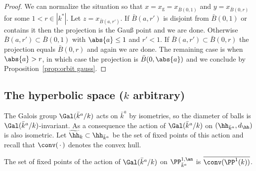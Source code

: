 \begin{proof}
We can normalize the situation so that $x = x_{\mathrm{g}} = x_{\bar B(0,1)}$ and $y = x_{\bar B(0,r)}$ for some $1<r\in |k^*|$. Let $z = x_{\bar B(a, r')}$. If $\bar B(a, r')$ is disjoint from $\bar B(0,1)$ or contains it then the projection is the Gau{\ss} point and we are done. Otherwise $\bar B(a, r') \subset \bar B(0,1)$ with $\abs{a}\leq 1$ and $r'<1$. If $\bar B(a, r') \subset \bar B(0,r)$ the projection equals $\bar B(0,r)$ and again we are done. The remaining case is when $\abs{a} >r $, in which case the projection is $\bar B(0,\abs{a})$ and we conclude by Proposition~\ref{prop:orbit gauss}.
\end{proof}

\subsection{The hyperbolic space (\texorpdfstring{$k$}{k} arbitrary)} \label{subs:hyperbolic arbitrary}

The Galois group $\Gal(\bar{k}^a/k)$ acts on $\bar{k}^a$ by isometries, so the diameter of balls is $\Gal(\bar{k}^a/k)$-invariant. As a consequence the action of $\Gal(\bar{k}^a/k)$ on $(\hh_{\bar{k}^a},d_\hh)$ is also isometric. Let $\widetilde{\hh}_k\subset\hh_{\bar{k}^a}$ be the set of fixed points of this action and recall that $\conv({\,\cdot\,})$ denotes the convex hull.

\begin{lemm}\label{lem:fixx}
The set of fixed points of the action of $\Gal(\bar{k}^a/k)$ on $\PP^{1,\an}_{\bar{k}^a}$ is $\overline{\conv(\PP^1(k))}$.
\end{lemm}


